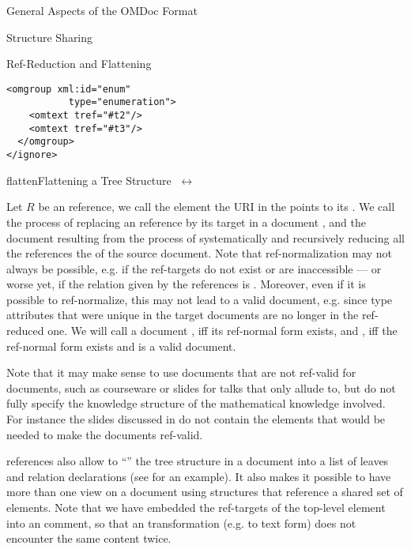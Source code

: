 \begin{tchapter}[id=spec-intro]{General Aspects of the OMDoc Format}
\begin{tsection}[id=sharing,short=Structure Sharing]{Structure Sharing}
\begin{tsubsection}[id=flattning]{Ref-Reduction and Flattening}
{\begin{minipage}{5.5cm}
\begin{lstlisting}[label=flattenb,mathescape,frame=none,numbers=none,index={omgroup,omtext}]
  <omgroup xml:id="enum" 
           type="enumeration">
    <omtext tref="#t2"/>
    <omtext tref="#t3"/>
  </omgroup>
</ignore>
\end{lstlisting}
\end{minipage}}
\begin{myfig}{flatten}{Flattening a Tree Structure}
$\;\leftrightarrow\;$
\end{myfig}

Let $R$ be an {\omdoc} reference, we call the element the URI in the
{} points to its {}.  We call the process of replacing
an {\omdoc} reference by its target in a document , and the
document resulting from the process of systematically and recursively reducing all the
{\omdoc} references the {} of the source document. Note that
ref-normalization may not always be possible, e.g.  if the ref-targets do not exist or are
inaccessible --- or worse yet, if the relation given by the {\omdoc} references is
{}. Moreover, even if it is possible to ref-normalize, this may not lead
to a valid {\omdoc} document, e.g.  since {} type attributes
that were unique in the target documents are no longer in the ref-reduced
one. We will call a document {}, iff its ref-normal form exists, and
, iff the ref-normal form exists and is a valid {\omdoc} document.
  
Note that it may make sense to use documents that are not ref-valid for
{} documents, such as courseware or slides for talks that
only allude to, but do not fully specify the knowledge structure of the mathematical
knowledge involved. For instance the slides discussed in {}
do not contain the {} elements that would be needed to make the documents
ref-valid.

{\omdoc} references also allow to ``{}'' the tree structure in a
document into a list of leaves and relation declarations (see {} for an
example). It also makes it possible to have more than one view on a document using
{} structures that reference a shared set of {\omdoc} elements. Note that
we have embedded the ref-targets of the top-level {} element
into an {} comment, so that an {\omdoc} transformation (e.g. to text form)
does not encounter the same content twice.
\end{tsubsection}


\end{tsection}
\end{tchapter}
